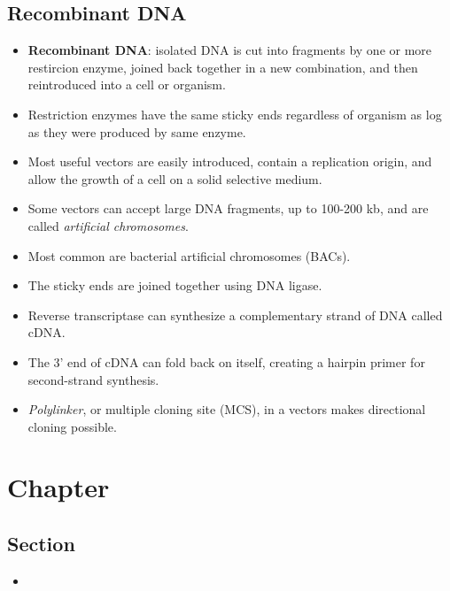 \documentclass[12pt,a4paper]{article}
\begin{document}
\subsection{Recombinant DNA}
\begin{itemize}
    \item \textbf{Recombinant DNA}: isolated DNA is cut into fragments by one or more restircion enzyme, joined back together in a new combination, and then reintroduced into a cell or organism.
    \item Restriction enzymes have the same sticky ends regardless of organism as log as they were produced by same enzyme.
    \item Most useful vectors are easily introduced, contain a replication origin, and allow the growth of a cell on a solid selective medium.
    \item Some vectors can accept large DNA fragments, up to 100-200 kb, and are called \textit{artificial chromosomes}. 
    \item Most common are bacterial artificial chromosomes (BACs).
    \item The sticky ends are joined together using DNA ligase.
    \item Reverse transcriptase can synthesize a complementary strand of DNA called cDNA.
    \item The 3' end of cDNA can fold back on itself, creating a hairpin primer for second-strand synthesis.
    \item \textit{Polylinker}, or multiple cloning site (MCS), in a vectors makes directional cloning possible. 
\end{itemize}
\setcounter{section}{12}
\clearpage
\section{Chapter}
\subsection{Section}
\begin{itemize}
    \item 
\end{itemize}

\clearpage
\end{document}
